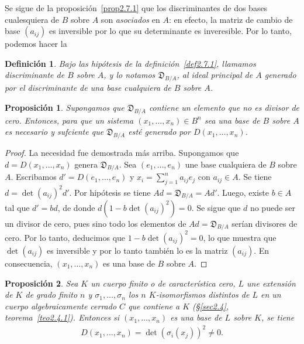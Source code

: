 \documentclass[oneside,bibtotoc,leqno,spanish]{amsbook}
\newcommand{\disc}{\mathfrak{D}}
\numberwithin{equation}{section}
\theoremstyle{defi}
\newtheorem{definition}{Definici\'on}
\theoremstyle{note}
\newtheorem{proposition}{Proposici\'on}
\theoremstyle{rem}
\numberwithin{theorem}{section}
\numberwithin{proposition}{section}
\numberwithin{definition}{section}
\numberwithin{lemma}{section}
\numberwithin{corollary}{section}
\numberwithin{example}{section}
\numberwithin{footnote}{section}%
\begin{document}
Se sigue de la proposici\'on~\ref{prop2.7.1} que los discriminantes de dos bases cualesquiera de $B$ sobre $A$ son {\em asociados}
en $A$: en efecto, la matriz de cambio de base $(a_{ij})$ es inversible por lo que su determinante es inveresible.
Por lo tanto, podemos hacer la

\begin{definition}\label{def2.7.2}
Bajo las hip\'otesis de la definici\'on~\ref{def2.7.1}, llamamos discriminante de $B$ sobre $A$, y lo notamos $\disc_{B/A}$,
al ideal principal de $A$ generado por el discriminante de una base cualquiera de $B$ sobre $A$.
\end{definition}

\begin{proposition}
Supongamos que $\disc_{B/A}$ contiene un elemento que no es divisor de cero. Entonces, para que un sistema
$(x_{1},\dots,x_{n})\in B^{n}$ sea una base de $B$ sobre $A$ es necesario y sufciente que $\disc_{B/A}$ est\'e
generado por $D(x_{1},\dots,x_{n})$.
\end{proposition}

\begin{proof}
La necesidad fue demostrada m\'as arriba. Supongamos que $d = D(x_{1},\dots,x_{n})$ genera
$\disc_{B/A}$. Sea $(e_{1},\dots,e_{n})$ une base cualquiera de $B$ sobre $A$.
Escribamos $d' = D(e_{1},\dots,e_{n})$ y $x_{i} = \sum_{j=1}^{n}a_{ij}e_{j}$ con $a_{ij}\in A$. Se tiene
$d = \det(a_{ij})^{2}d'$. Por hip\'otesis se tiene $Ad = \disc_{B/A} = Ad'$. Luego, existe $b\in A$ tal que
$d' = bd$, de donde $d(1-b\det(a_{ij})^{2}) = 0$. Se sigue que $d$ no puede ser un divisor de cero, pues sino
todo los elementos de $Ad = \disc_{B/A}$ ser\'ian divisores de cero. Por lo tanto, deducimos que
$1-b\det(a_{ij})^{2} = 0$, lo que muestra que $\det(a_{ij})$ es inversible y por lo tanto tambi\'en lo es
la matriz $(a_{ij})$. En consecuencia, $(x_{1},\dots,x_{n})$ es una base de $B$ sobre $A$.
\end{proof}

\begin{proposition}\label{prop2.7.3}
Sea $K$ un cuerpo finito o de caracter\'istica cero, $L$ une extensi\'on de $K$ de grado finito $n$ y
$\sigma_{1},\dots,\sigma_{n}$ los $n$ $K$-isomorfismos distintos de $L$ en un cuerpo algebraicamente cerrado
$C$ que contiene a $K$ (\S\ref{sec2.4}, teorema~\ref{teo2.4.1}). Entonces si $(x_{1},\dots,x_{n})$ es una base de $L$ sobre $K$, se tiene
\begin{gather}
D(x_{1},\dots,x_{n}) = \det(\sigma_{i}(x_{j}))^{2}\neq 0.
\end{gather}
\end{proposition}
\end{document}
